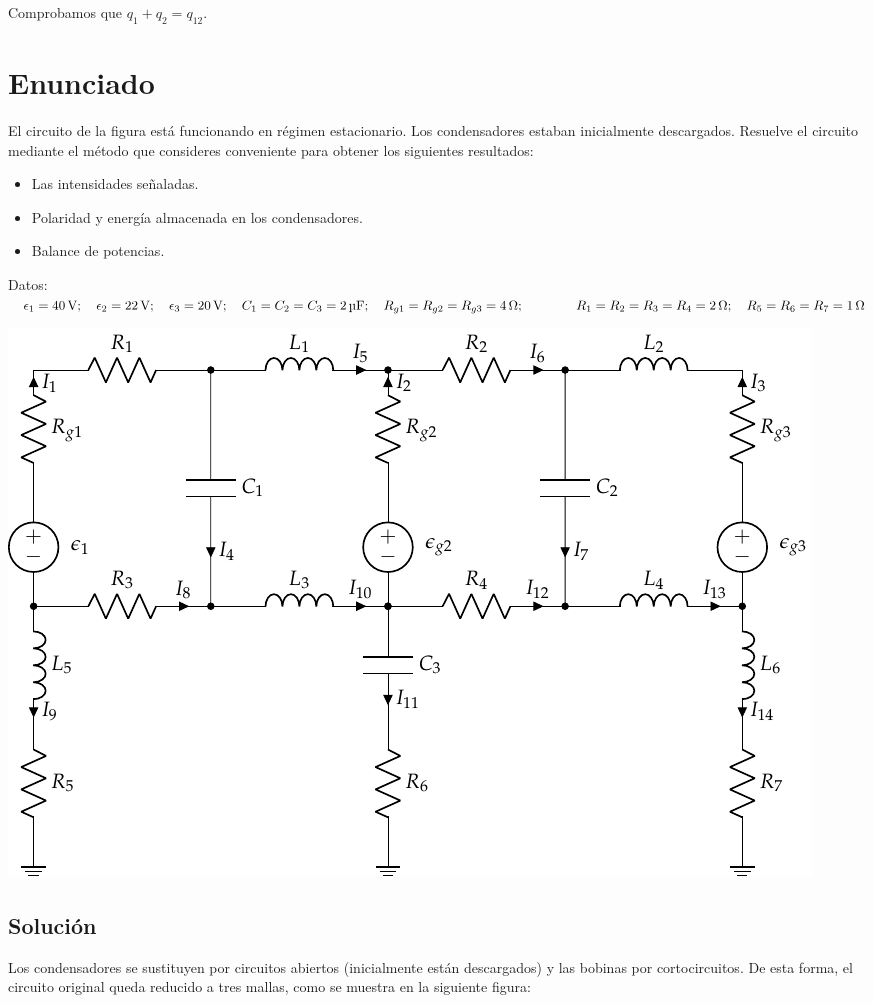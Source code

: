 Comprobamos que $q_1 + q_2 = q_{12}$.
\section{Enunciado}
El circuito de la figura está funcionando en régimen estacionario. Los
condensadores estaban inicialmente descargados. Resuelve el circuito
mediante el método que consideres conveniente para obtener los
siguientes resultados:
\begin{itemize}
\item Las intensidades señaladas.
\item Polaridad y energía almacenada en los condensadores.
\item Balance de potencias.
\end{itemize}
Datos:
$ \quad \epsilon_{1}=\qty{40}{\volt}; \quad \epsilon_{2}=\qty{22}{\volt}; \quad \epsilon_{3}=\qty{20}{\volt}; \quad
C_{1}=C_{2}=C_{3}=\qty{2}{\micro\farad}; \quad R_{g1}=R_{g2}=R_{g3}=\qty{4}{\ohm}; 
\\
\hspace*{14mm} R_{1}=R_{2}=R_{3}=R_{4}=\qty{2}{\ohm}; \quad R_{5}=R_{6}=R_{7}=\qty{1}{\ohm}$


\begin{center}
  \includegraphics{figuras/mallas_condensadores_bobinas.pdf}
\end{center}


\subsection*{Solución}
Los condensadores se sustituyen por circuitos abiertos (inicialmente
están descargados) y las bobinas por cortocircuitos. De esta forma, el
circuito original queda reducido a tres mallas, como se muestra en la
siguiente figura:

